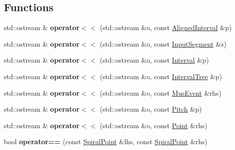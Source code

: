 \subsection*{Functions}
\begin{DoxyCompactItemize}
\item 
\mbox{\label{group__segment_gaa5d5d2dd440400af33e39d031cb08fa5}} 
std\+::ostream \& {\bfseries operator$<$$<$} (std\+::ostream \&o, const \mbox{\hyperlink{classAlignedInterval}{Aligned\+Interval}} \&p)
\item 
\mbox{\label{group__segment_ga6c33ecb9851e077e90345090b15c87c3}} 
std\+::ostream \& {\bfseries operator$<$$<$} (std\+::ostream \&o, const \mbox{\hyperlink{classInputSegment}{Input\+Segment}} \&s)
\item 
\mbox{\label{group__segment_ga2f4c47a191d9e8f503a8a18bfba89f2c}} 
std\+::ostream \& {\bfseries operator$<$$<$} (std\+::ostream \&o, const \mbox{\hyperlink{classInterval}{Interval}} \&p)
\item 
\mbox{\label{group__segment_gac85491c9b09a0e009fe58f15da5e88ab}} 
std\+::ostream \& {\bfseries operator$<$$<$} (std\+::ostream \&o, const \mbox{\hyperlink{classIntervalTree}{Interval\+Tree}} \&p)
\item 
\mbox{\label{group__segment_gade87c7b11c1a1fdbcd922e08b3eaa3c5}} 
std\+::ostream \& {\bfseries operator$<$$<$} (std\+::ostream \&o, const \mbox{\hyperlink{classMusEvent}{Mus\+Event}} \&rhs)
\item 
\mbox{\label{group__segment_ga7d6e1aa31e5a2132257840adeb5bf23f}} 
std\+::ostream \& {\bfseries operator$<$$<$} (std\+::ostream \&o, const \mbox{\hyperlink{classPitch}{Pitch}} \&p)
\item 
\mbox{\label{group__segment_gad95cc714e40b63c5df8e1dc41305178e}} 
std\+::ostream \& {\bfseries operator$<$$<$} (std\+::ostream \&o, const \mbox{\hyperlink{classPoint}{Point}} \&rhs)
\item 
\mbox{\label{group__segment_gaf9d08e42ae7632f815ad7bd3c093b497}} 
bool {\bfseries operator==} (const \mbox{\hyperlink{structSpiralPoint}{Spiral\+Point}} \&lhs, const \mbox{\hyperlink{structSpiralPoint}{Spiral\+Point}} \&rhs)

\end{DoxyCompactItemize}
